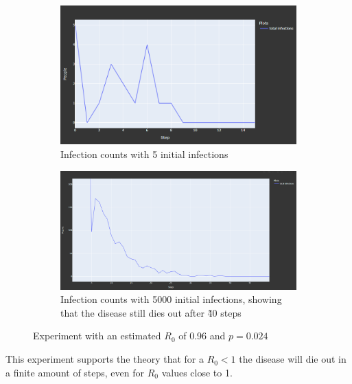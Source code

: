 \begin{figure}
    \centering
    \begin{subfigure}[b]{0.475\textwidth}
        \centering
        \includegraphics[width=\textwidth]{images/exp_r0_small_1.png}
        \caption[Network2]%
        {{\small Infection counts with 5 initial infections}}   
    \end{subfigure}
    \hfill
    \begin{subfigure}[b]{0.475\textwidth}  
        \centering 
        \includegraphics[width=\textwidth]{images/exp_r0_success.png}
        \caption[]%
        {{\small Infection counts with 5000 initial infections, showing that the disease
        still dies out after \~40 steps}}    
    \end{subfigure}
    \caption[ Experiment with an estimated $R_0$ of 0.96 and $p = 0.024$ ]
    {\small Experiment with an estimated $R_0$ of 0.96 and $p = 0.024$} 
    \label{fig:exp_r0_small}
\end{figure}



This experiment supports the theory that for a $R_0 < 1$ the disease will die out in a finite amount of steps, even for $R_0$ values close to 1. 

